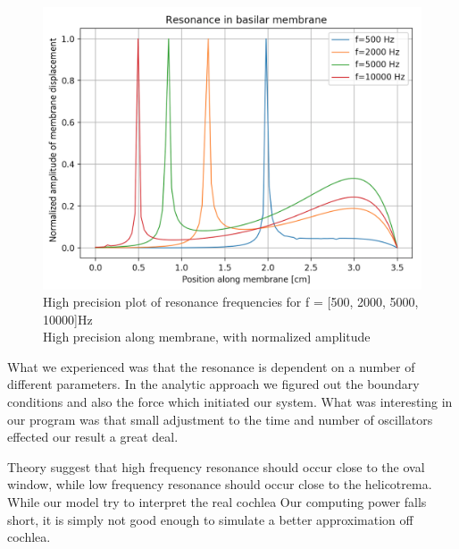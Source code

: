 \documentclass[twoside,twocolumn]{article}
\begin{document}
\begin{figure}[ht]
\centerline{\includegraphics[scale= 0.55]{CorrectResonance.png}}
\caption{High precision plot of resonance frequencies for f = [500, 2000, 5000, 10000]Hz \\ High precision along membrane, with normalized amplitude}
\end{figure}

 What we experienced was that the resonance is dependent on a number of different parameters. In the analytic approach we figured out the boundary conditions and also the force which initiated our system. What was interesting in our program was that small adjustment to the time and number of oscillators effected our result a great deal. 
 
Theory suggest that high frequency resonance should occur close to the oval window, while low frequency resonance should occur close to the helicotrema. While our model try to interpret the real cochlea Our computing power falls short, it is simply not good enough to simulate a better approximation off cochlea. 
 
\bigskip



\end{document}
